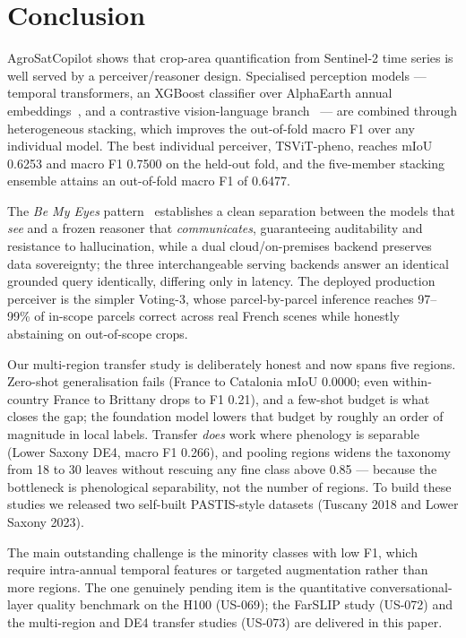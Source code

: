 \section{Conclusion}
\label{sec:conclusion}

AgroSatCopilot shows that crop-area quantification from Sentinel-2 time
series is well served by a perceiver/reasoner design. Specialised
perception models --- temporal transformers, an XGBoost classifier over
AlphaEarth annual embeddings~\cite{brown2025alphaearth}, and a
contrastive vision-language branch~\cite{li2025farslip} --- are combined
through heterogeneous stacking, which improves the out-of-fold macro F1
over any individual model. The best individual perceiver, TSViT-pheno,
reaches mIoU 0.6253 and macro F1 0.7500 on the held-out fold, and the
five-member stacking ensemble attains an out-of-fold macro F1 of 0.6477.

The \emph{Be My Eyes} pattern~\cite{huang2025bemyeyes} establishes a
clean separation between the models that \emph{see} and a frozen
reasoner that \emph{communicates}, guaranteeing auditability and
resistance to hallucination, while a dual cloud/on-premises backend
preserves data sovereignty; the three interchangeable serving backends
answer an identical grounded query identically, differing only in
latency. The deployed production perceiver is the simpler Voting-3,
whose parcel-by-parcel inference reaches 97--99\% of in-scope parcels
correct across real French scenes while honestly abstaining on
out-of-scope crops.

Our multi-region transfer study is deliberately honest and now spans
five regions. Zero-shot generalisation fails (France to Catalonia mIoU
0.0000; even within-country France to Brittany drops to F1 0.21), and a
few-shot budget is what closes the gap; the foundation model lowers that
budget by roughly an order of magnitude in local labels. Transfer
\emph{does} work where phenology is separable (Lower Saxony DE4, macro
F1 0.266), and pooling regions widens the taxonomy from 18 to 30 leaves
without rescuing any fine class above 0.85 --- because the bottleneck is
phenological separability, not the number of regions. To build these
studies we released two self-built PASTIS-style datasets (Tuscany 2018
and Lower Saxony 2023).

The main outstanding challenge is the minority classes with low F1,
which require intra-annual temporal features or targeted augmentation
rather than more regions. The one genuinely pending item is the
quantitative conversational-layer quality benchmark on the H100
(US-069); the FarSLIP study (US-072) and the multi-region and DE4
transfer studies (US-073) are delivered in this paper.
